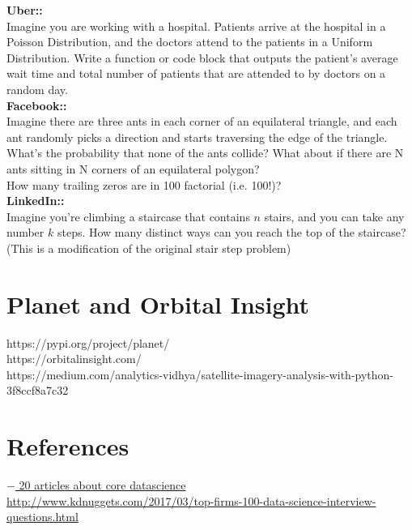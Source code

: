 \documentclass[11pt]{article}
\begin{document}
{\bf Uber:: }\\
Imagine you are working with a hospital. Patients arrive at the hospital in a Poisson Distribution, and the doctors attend to the patients in a Uniform Distribution. Write a function or code block that outputs the patient’s average wait time and total number of patients that are attended to by doctors on a random day.\\

{\bf Facebook:: }\\
Imagine there are three ants in each corner of an equilateral triangle, and each ant randomly picks a direction and starts traversing the edge of the triangle. What’s the probability that none of the ants collide? What about if there are N ants sitting in N corners of an equilateral polygon?\\
How many trailing zeros are in 100 factorial (i.e. 100!)?\\

{\bf LinkedIn:: }\\
Imagine you’re climbing a staircase that contains $n$ stairs, and you can take any number $k$ steps. How many distinct ways can you reach the top of the staircase? (This is a modification of the original stair step problem) \\


\newpage
\section{Planet and Orbital Insight}
https://pypi.org/project/planet/\\
https://orbitalinsight.com/ \\
https://medium.com/analytics-vidhya/satellite-imagery-analysis-with-python-3f8ccf8a7c32


\newpage
\section{References}
\href{http://www.datasciencecentral.com/profiles/blogs/20-articles-about-core-data-science}{$-$ 20 articles about core datascience}\\
\href{http://www.kdnuggets.com/2017/03/top-firms-100-data-science-interview-questions.html}{http://www.kdnuggets.com/2017/03/top-firms-100-data-science-interview-questions.html}
\end{document}
